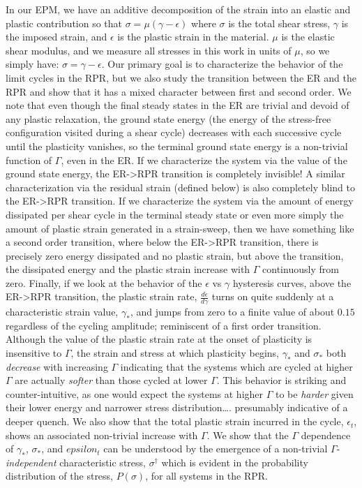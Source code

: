 \documentclass[%
 prl,
 amsmath,amssymb,
%
 reprint,%
]{revtex4-1}
\begin{document}
In our EPM, we have an additive decomposition of the strain into an elastic and plastic contribution so that $\sigma=\mu (\gamma-\epsilon)$ where $\sigma$ is the total shear stress, $\gamma$ is the imposed strain, and $\epsilon$ is the plastic strain in the material.
$\mu$ is the elastic shear modulus, and we measure all stresses in this work in units of $\mu$, so we simply have: $\sigma=\gamma-\epsilon$.
Our primary goal is to characterize the behavior of the limit cycles in the RPR, but we also study the transition between the ER and the RPR and show that it has a mixed character between first and second order.
We note that even though the final steady states in the ER are trivial and devoid of any plastic relaxation, the ground state energy (the energy of the stress-free configuration visited during a shear cycle) decreases with each successive cycle until the plasticity vanishes, so the terminal ground state energy is a non-trivial function of $\Gamma$, even in the ER.  
If we characterize the system via the value of the ground state energy, the ER->RPR transition is completely invisible!
A similar characterization via the residual strain (defined below) is also completely blind to the ER->RPR transition.
If we characterize the system via the amount of energy dissipated per shear cycle in the terminal steady state or even more simply the amount of plastic strain generated in a strain-sweep, then we have something like a second order transition, where below the ER->RPR transition, there is precisely zero energy dissipated and no plastic strain, but above the transition, the dissipated energy and the plastic strain increase with $\Gamma$ continuously from zero.
Finally, if we look at the behavior of the $\epsilon$ vs $\gamma$ hysteresis curves, above the ER->RPR transition, the plastic strain rate, $\frac{d \epsilon}{d\gamma }$ turns on quite suddenly at a characteristic strain value, $\gamma_*$, and jumps from zero to a finite value of about $0.15$ regardless of the cycling amplitude; reminiscent of a first order transition.
Although the value of the plastic strain rate at the onset of plasticity is insensitive to $\Gamma$, the strain and stress at which plasticity begins, $\gamma_*$ and $\sigma_*$ both \emph{decrease} with increasing $\Gamma$ indicating that the systems which are cycled at higher $\Gamma$ are actually \emph{softer} than those cycled at lower $\Gamma$.
This behavior is striking and counter-intuitive, as one would expect the systems at higher $\Gamma$ to be \emph{harder} given their lower energy and narrower stress distribution…. presumably indicative of a deeper quench.
We also show that the total plastic strain incurred in the cycle, $\epsilon_t$, shows an associated non-trivial increase with $\Gamma$. 
We show that the $\Gamma$ dependence of $\gamma_*$, $\sigma_*$, and $epsilon_t$ can be understood by the emergence of a non-trivial $\Gamma$-\emph{independent} characteristic stress, $\sigma^\dagger$ which is evident in the probability distribution of the stress, $P(\sigma)$, for all systems in the RPR.  
\end{document}
